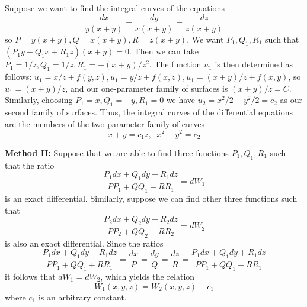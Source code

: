     \begin{example}
        Suppose we want to find the integral curves of the equations \begin{equation*}
            \frac{dx}{y(x+y)} = \frac{dy}{x(x+y)} = \frac{dz}{z(x+y)}
        \end{equation*}
        so $P = y(x+y),Q = x(x+y),R = z(x+y)$. We want $P_1,Q_1,R_1$ such that $(P_1y+Q_1x+R_1z)(x+y) = 0$. Then we can take $P_1 = 1/z, Q_1 = 1/z, R_1 = -(x+y)/z^2$. The function $u_1$ is then determined as follows: $u_1 = x/z+f(y,z),u_1 = y/z+f(x,z), u_1 = (x+y)/z+f(x,y)$, so $u_1 = (x+y)/z$, and our one-parameter family of surfaces is $(x+y)/z = C$. Similarly, choosing $P_1 = x,Q_1 = -y, R_1 = 0$ we have $u_2 = x^2/2-y^2/2 = c_2$ as our second family of surfaces. Thus, the integral curves of the differential equations are the members of the two-parameter family of curves\begin{equation*}
            x+y = c_1z, \;\;x^2-y^2 = c_2
        \end{equation*}
    \end{example}

    \textbf{Method II:} Suppose that we are able to find three functions $P_1,Q_1,R_1$ such that the ratio \begin{equation*}
        \frac{P_1dx+Q_1dy+R_1dz}{PP_1+QQ_1+RR_1} = dW_1
    \end{equation*}
    is an exact differential. Similarly, suppose we can find other three functions such that \begin{equation*}
        \frac{P_2dx+Q_2dy+R_2dz}{PP_2+QQ_2+RR_2} = dW_2
    \end{equation*}
    is also an exact differential. Since the ratios \begin{equation*}
        \frac{P_1dx+Q_1dy+R_1dz}{PP_1+QQ_1+RR_1} = \frac{dx}{P}=\frac{dy}{Q} =\frac{dz}{R} = \frac{P_1dx+Q_1dy+R_1dz}{PP_1+QQ_1+RR_1}
    \end{equation*}
    it follows that $dW_1 = dW_2$, which yields the relation \begin{equation*}
        W_1(x,y,z) = W_2(x,y,z) +c_1
    \end{equation*}
    where $c_1$ is an arbitrary constant.

